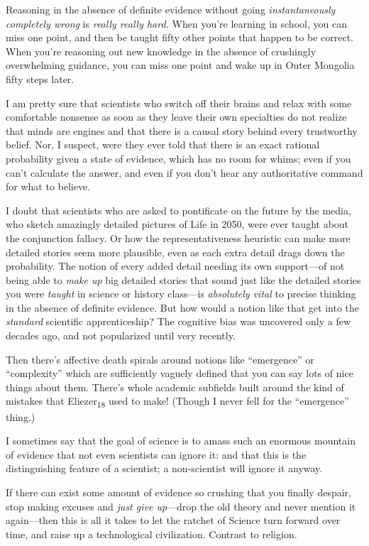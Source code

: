 {
 Reasoning in the absence of definite evidence without going
\textit{instantaneously completely wrong} is \textit{really really
hard.} When you're learning in school, you can miss one
point, and then be taught fifty other points that happen to be correct.
When you're reasoning out new knowledge in the absence
of crushingly overwhelming guidance, you can miss one point and wake up
in Outer Mongolia fifty steps later.}

{
 I am pretty sure that scientists who switch off their brains and
relax with some comfortable nonsense as soon as they leave their own
specialties do not realize that minds are engines and that there is a
causal story behind every trustworthy belief. Nor, I suspect, were they
ever told that there is an exact rational probability given a state of
evidence, which has no room for whims; even if you
can't calculate the answer, and even if you
don't hear any authoritative command for what to
believe.}

{
 I doubt that scientists who are asked to pontificate on the future
by the media, who sketch amazingly detailed pictures of Life in 2050,
were ever taught about the conjunction fallacy. Or how the
representativeness heuristic can make more detailed stories seem more
plausible, even as each extra detail drags down the probability. The
notion of every added detail needing its own support---of not being
able to \textit{make up} big detailed stories that sound just like the
detailed stories you were \textit{taught} in science or history
class---is \textit{absolutely vital} to precise thinking in the absence
of definite evidence. But how would a notion like that get into the
\textit{standard} scientific apprenticeship? The cognitive bias was
uncovered only a few decades ago, and not popularized until very
recently.}

{
 Then there's affective death spirals around
notions like ``emergence'' or
``complexity'' which are
sufficiently vaguely defined that you can say lots of nice things about
them. There's whole academic subfields built around the
kind of mistakes that Eliezer\textsubscript{18} used to make! (Though I
never fell for the ``emergence''
thing.)}

{
 I sometimes say that the goal of science is to amass such an
enormous mountain of evidence that not even scientists can ignore it:
and that this is the distinguishing feature of a scientist; a
non-scientist will ignore it anyway.}

{
 If there can exist some amount of evidence so crushing that you
finally despair, stop making excuses and \textit{just give up}{}---drop
the old theory and never mention it again---then this is all it takes
to let the ratchet of Science turn forward over time, and raise up a
technological civilization. Contrast to religion.}

